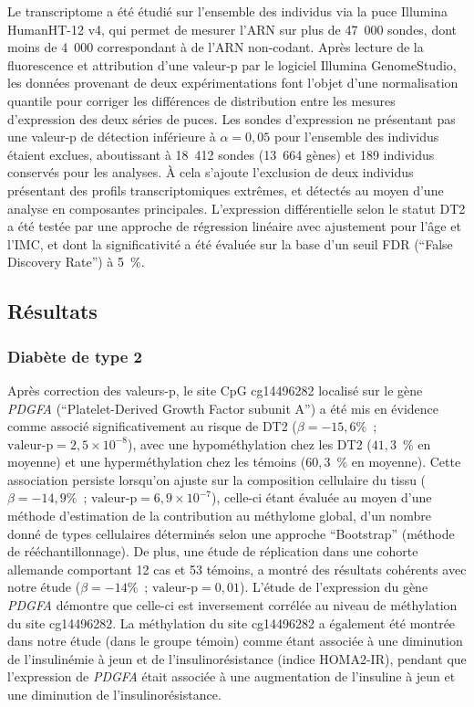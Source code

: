\documentclass[11pt,a4paper,notrimn]{krantz}
\theoremstyle{definition}
\theoremstyle{definition}
\theoremstyle{remark}
\begin{document}
Le transcriptome a été étudié sur l'ensemble des individus via la puce
Illumina HumanHT-12 v4, qui permet de mesurer l'ARN sur plus de 47~000
sondes, dont moins de 4~000 correspondant à de l'ARN non-codant. Après
lecture de la fluorescence et attribution d'une valeur-p par le logiciel
Illumina GenomeStudio, les données provenant de deux expérimentations
font l'objet d'une normalisation quantile pour corriger les différences
de distribution entre les mesures d'expression des deux séries de puces.
Les sondes d'expression ne présentant pas une valeur-p de détection
inférieure à \(\alpha = 0,05\) pour l'ensemble des individus étaient
exclues, aboutissant à 18~412 sondes (13~664 gènes) et 189 individus
conservés pour les analyses. À cela s'ajoute l'exclusion de deux
individus présentant des profils transcriptomiques extrêmes, et détectés
au moyen d'une analyse en composantes principales. L'expression
différentielle selon le statut DT2 a été testée par une approche de
régression linéaire avec ajustement pour l'âge et l'IMC, et dont la
significativité a été évaluée sur la base d'un seuil FDR (``False
Discovery Rate'') à 5~\%.

\subsection{Résultats}\label{resultats-2}

\subsubsection{Diabète de type 2}\label{diabete-de-type-2}

Après correction des valeurs-p, le site CpG cg14496282 localisé sur le
gène \emph{PDGFA} (``Platelet-Derived Growth Factor subunit A'') a été
mis en évidence comme associé significativement au risque de DT2
(\(\beta = -15,6 \%\)~; \(\textrm{valeur-p}=2,5\times 10^{-8}\)), avec
une hypométhylation chez les DT2 (\(41,3\)~\% en moyenne) et une
hyperméthylation chez les témoins (\(60,3\)~\% en moyenne). Cette
association persiste lorsqu'on ajuste sur la composition cellulaire du
tissu (\(\beta = -14,9 \%\)~; \(\textrm{valeur-p}=6,9\times 10^{-7}\)),
celle-ci étant évaluée au moyen d'une méthode d'estimation de la
contribution au méthylome global, d'un nombre donné de types cellulaires
déterminés selon une approche ``Bootstrap'' (méthode de
rééchantillonnage). De plus, une étude de réplication dans une cohorte
allemande comportant 12 cas et 53 témoins, a montré des résultats
cohérents avec notre étude (\(\beta = -14 \%\)~;
\(\textrm{valeur-p}=0,01\)). L'étude de l'expression du gène
\emph{PDGFA} démontre que celle-ci est inversement corrélée au niveau de
méthylation du site cg14496282. La méthylation du site cg14496282 a
également été montrée dans notre étude (dans le groupe témoin) comme
étant associée à une diminution de l'insulinémie à jeun et de
l'insulinorésistance (indice HOMA2-IR), pendant que l'expression de
\emph{PDGFA} était associée à une augmentation de l'insuline à jeun et
une diminution de l'insulinorésistance.
\end{document}
